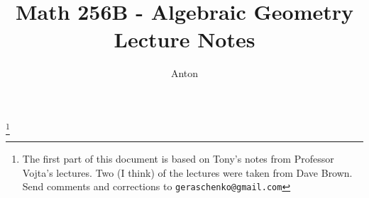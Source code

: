 \documentclass[11pt,reqno]{amsart}
\newcounter{lecture}
\theoremstyle{plain}
\theoremstyle{definition}
\theoremstyle{remark}
\begin{document}
 \title{Math 256B - Algebraic Geometry \\ Lecture Notes}
 \author{Anton}
 \thanks{
   The first part of this document is based on Tony's notes from
   Professor Vojta's lectures. Two (I think) of the lectures were taken from Dave Brown.
   Send comments and corrections to \texttt{geraschenko@gmail.com}
 }
 \maketitle

 {}
 {}
 {}
 {}
 {}
 {}
 {}
 {}
 {}
 {}
 {}
 {}
 {}
 {}
 {}
 {}
 {}
 {}
 {}
 {}
 {}
 {}
 {}
 {}
 {}
 {}
 {}
 {}
 {}
 {}
 {}
\end{document}
